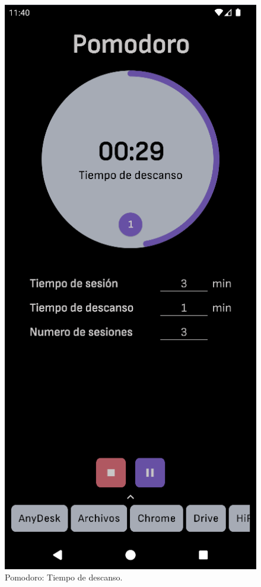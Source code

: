 \begin{figure}[ht!]
\begin{minipage}{0.43\textwidth}
  \end{minipage}\hspace{0.05\textwidth}
  \begin{minipage}{0.43\textwidth}
    \caption{Pomodoro: Tiempo de descanso.}
    \label{fig:pomodoro:tiempo_descanso}
    \includegraphics[width=\textwidth]{Figuras/secciones/pomodoro_tiempo_descanso.png}
    \centering
  \end{minipage}
\end{figure}

